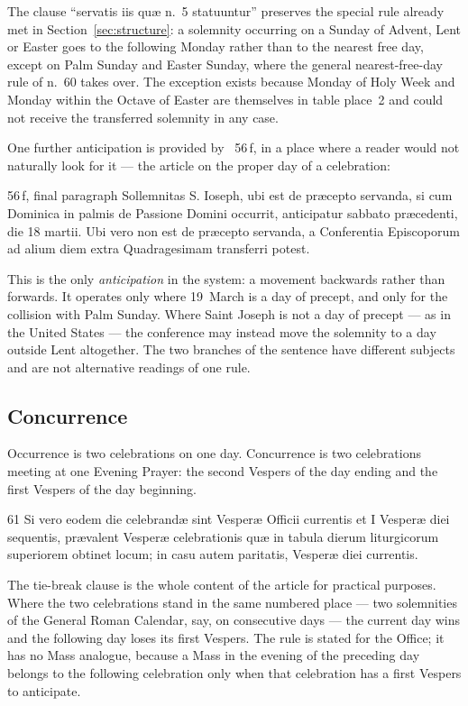 The clause ``servatis iis quæ n.~5 statuuntur'' preserves the special rule already met in
Section~\ref{sec:structure}: a solemnity occurring on a Sunday of Advent, Lent or Easter goes to the following Monday
rather than to the nearest free day, except on Palm Sunday and Easter Sunday, where the general
nearest-free-day rule of n.~60 takes over. The exception exists because Monday of Holy Week and
Monday within the Octave of Easter are themselves in table place~2 and could not receive the
transferred solemnity in any case.

One further anticipation is provided by ~56\,f, in a place where a reader would not
naturally look for it --- the article on the proper day of a celebration:

\begin{normtext}{ 56\,f, final paragraph}
Sollemnitas S. Ioseph, ubi est de præcepto servanda, si cum Dominica in palmis de Passione Domini
occurrit, anticipatur sabbato præcedenti, die 18 martii. Ubi vero non est de præcepto servanda, a
Conferentia Episcoporum ad alium diem extra Quadragesimam transferri potest.
\end{normtext}

This is the only \emph{anticipation} in the system: a movement backwards rather than forwards. It
operates only where 19~March is a day of precept, and only for the collision with Palm Sunday. Where
Saint Joseph is not a day of precept --- as in the United States --- the conference may instead move
the solemnity to a day outside Lent altogether. The two branches of the sentence have different
subjects and are not alternative readings of one rule.

\subsection{Concurrence}

Occurrence is two celebrations on one day. Concurrence is two celebrations meeting at one Evening
Prayer: the second Vespers of the day ending and the first Vespers of the day beginning.

\begin{normtext}{ 61}
Si vero eodem die celebrandæ sint Vesperæ Officii currentis et I Vesperæ diei sequentis, prævalent
Vesperæ celebrationis quæ in tabula dierum liturgicorum superiorem obtinet locum; in casu autem
paritatis, Vesperæ diei currentis.
\end{normtext}

The tie-break clause is the whole content of the article for practical purposes. Where the two
celebrations stand in the same numbered place --- two solemnities of the General Roman Calendar, say,
on consecutive days --- the current day wins and the following day loses its first Vespers. The rule
is stated for the Office; it has no Mass analogue, because a Mass in the evening of the preceding day
belongs to the following celebration only when that celebration has a first Vespers to anticipate.

